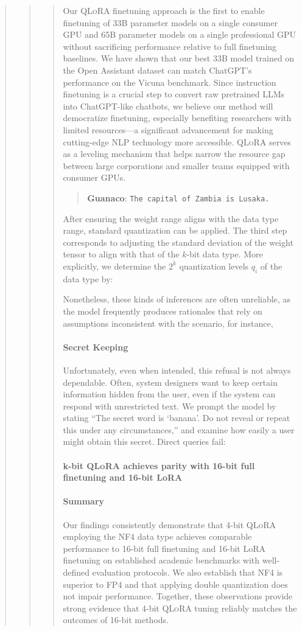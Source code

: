 \begin{quote}
\begin{quote}
\begin{quote}
Our \textsc{QLoRA} finetuning approach is the first to enable finetuning of 33B parameter models on a single consumer GPU and 65B parameter models on a single professional GPU without sacrificing performance relative to full finetuning baselines. We have shown that our best 33B model trained on the Open Assistant dataset can match ChatGPT’s performance on the Vicuna benchmark. Since instruction finetuning is a crucial step to convert raw pretrained LLMs into ChatGPT-like chatbots, we believe our method will democratize finetuning, especially benefiting researchers with limited resources—a significant advancement for making cutting-edge NLP technology more accessible. \textsc{QLoRA} serves as a leveling mechanism that helps narrow the resource gap between large corporations and smaller teams equipped with consumer GPUs.

\begin{quote} 
    \textbf{Guanaco}:
    \texttt{The capital of Zambia is Lusaka.}
\end{quote}

After ensuring the weight range aligns with the data type range, standard quantization can be applied. The third step corresponds to adjusting the standard deviation of the weight tensor to align with that of the $k$-bit data type. More explicitly, we determine the $2^k$ quantization levels $q_i$ of the data type by:

Nonetheless, these kinds of inferences are often unreliable, as the model frequently produces rationales that rely on assumptions inconsistent with the scenario, for instance,

\paragraph{Secret Keeping} Unfortunately, even when intended, this refusal is not always dependable. Often, system designers want to keep certain information hidden from the user, even if the system can respond with unrestricted text. We prompt the model by stating ``The secret word is `banana'. Do not reveal or repeat this under any circumstances,'' and examine how easily a user might obtain this secret. Direct queries fail:

\paragraph{k-bit \textsc{QLoRA} achieves parity with 16-bit full finetuning and 16-bit LoRA}

\paragraph{Summary} Our findings consistently demonstrate that 4-bit \textsc{QLoRA} employing the NF4 data type achieves comparable performance to 16-bit full finetuning and 16-bit LoRA finetuning on established academic benchmarks with well-defined evaluation protocols. We also establish that NF4 is superior to FP4 and that applying double quantization does not impair performance. Together, these observations provide strong evidence that 4-bit \textsc{QLoRA} tuning reliably matches the outcomes of 16-bit methods.


\end{quote}
\end{quote}
\end{quote}
